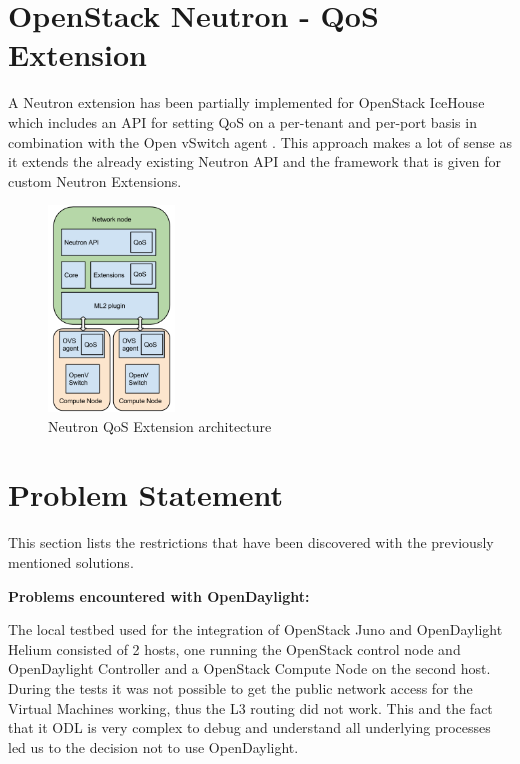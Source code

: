 \section{OpenStack Neutron - QoS Extension}

A Neutron extension has been partially implemented for OpenStack IceHouse which includes an API for setting QoS on a per-tenant and per-port basis in combination with the Open vSwitch agent \cite{neutron-qos}. This approach makes a lot of sense as it extends the already existing Neutron API and the framework that is given for custom Neutron Extensions.


\begin{figure}[H]
\centering
\includegraphics[width=0.3\textwidth]{images/sota/neutron_qos_extension.png}
\caption{Neutron QoS Extension architecture}
\end{figure}



\section{Problem Statement}

This section lists the restrictions that have been discovered with the previously mentioned solutions. 


\textbf{Problems encountered with OpenDaylight:}

The local testbed used for the integration of OpenStack Juno and OpenDaylight Helium consisted of 2 hosts, one running the OpenStack control node and OpenDaylight Controller and a OpenStack Compute Node on the second host. During the tests it was not possible to get the public network access for the Virtual Machines working, thus the L3 routing did not work. This and the fact that it ODL is very complex to debug and understand all underlying processes led us to the decision not to use OpenDaylight.


